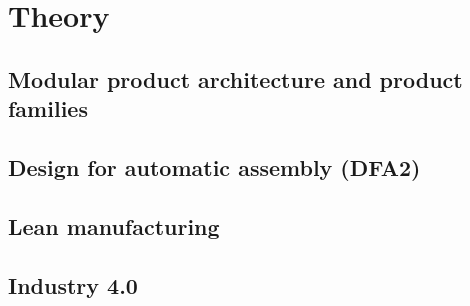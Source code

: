 \section{Theory}

\subsection{Modular product architecture and product families}

\subsection{Design for automatic assembly (DFA2)}

\subsection{Lean manufacturing}

\subsection{Industry 4.0}

